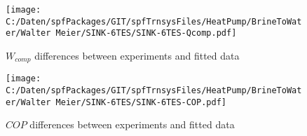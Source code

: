 \documentclass[english]{SPFShortReport}
\begin{document}
\begin{figure}[!ht]
\begin{center}
\texttt{[image: C:/Daten/spfPackages/GIT/spfTrnsysFiles/HeatPump/BrineToWater/Walter Meier/SINK-6TES/SINK-6TES-Qcomp.pdf]}
\caption{$W_{comp}$ differences between experiments and fitted data}
\label{QcompFig}
\end{center}
\end{figure}
\begin{figure}[!ht]
\begin{center}
\texttt{[image: C:/Daten/spfPackages/GIT/spfTrnsysFiles/HeatPump/BrineToWater/Walter Meier/SINK-6TES/SINK-6TES-COP.pdf]}
\caption{$COP$ differences between experiments and fitted data}
\label{COPFig}
\end{center}
\end{figure}
\end{document}
